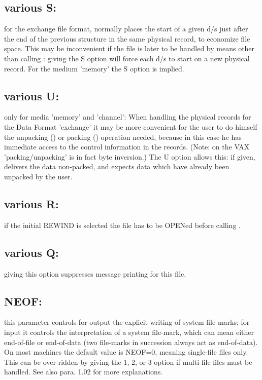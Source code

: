 \subsection*{various S:}

for the exchange file format,
 normally places the start of a given d/s just after
the end of the previous structure in the same physical record,
to economize file space.
This may be inconvenient if the file is later to be handled
by means other than calling : giving the S option
will force each d/s to start on a new physical record.
For the medium 'memory' the S option is implied.

\subsection*{various U:}

only for media 'memory' and 'channel':
When handling the physical records for the Data Format 'exchange'
it may be more convenient for the user to do himself the
unpacking () or packing () operation needed,
because in this case he has immediate access to the control
information in the records.
(Note: on the VAX 'packing/unpacking' is in fact byte inversion.)
The U option allows this:
if given,  delivers the data non-packed,
and  expects data which have already been unpacked by the user.

\subsection*{various R:}

if the initial REWIND is selected the file has to be OPENed
before calling .

\subsection*{various Q:}

giving this option suppresses message printing for this file.

\subsection*{NEOF:}

this parameter controls for output
the explicit writing of system file-marks;
for input it controls the interpretation of a system file-mark,
which can mean either end-of-file or end-of-data
(two file-marks in succession always act as end-of-data).
On most machines the default value is NEOF=0,
meaning single-file files only.
This can be over-ridden by giving the 1, 2, or 3 option
if multi-file files must be handled.
See also para. 1.02 for more explanations.

